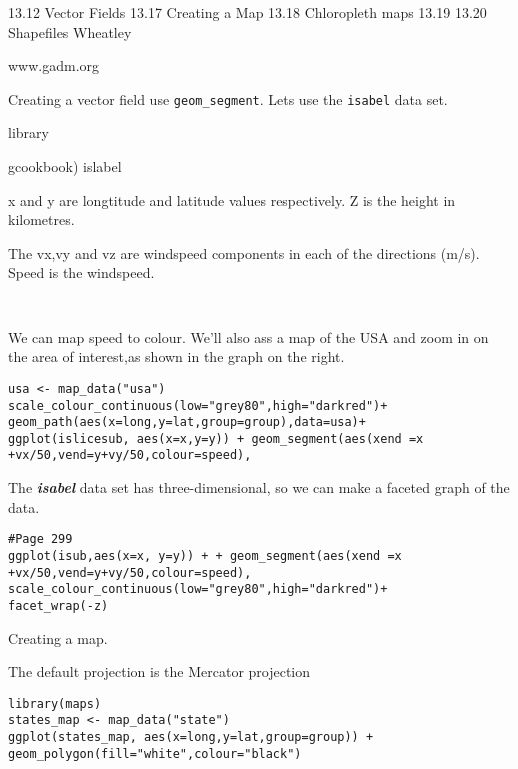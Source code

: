 13.12 Vector Fields
13.17 Creating a Map
13.18 Chloropleth maps
13.19 
13.20 Shapefiles
Wheatley

www.gadm.org

Creating a vector field
use \texttt{geom_segment}. Lets use the \texttt{isabel} data set.


library{gcookbook)
islabel

x and y are longtitude and latitude values respectively.
Z is the height in kilometres.

The vx,vy and vz are windspeed components in each of the directions (m/s).
Speed is the windspeed.

\begin{framed}
\begin{verbatim}


\end{verbatim}
\end{framed}

We can map speed to colour. We'll also ass a map of 
the USA and zoom in on the area of interest,as shown in the graph on the right.

\begin{verbatim}
usa <- map_data("usa")
scale_colour_continuous(low="grey80",high="darkred")+
geom_path(aes(x=long,y=lat,group=group),data=usa)+
ggplot(islicesub, aes(x=x,y=y)) + geom_segment(aes(xend =x +vx/50,vend=y+vy/50,colour=speed),
\end{verbatim}
The \textbf{\textit{isabel}} data set has three-dimensional, so we can make a faceted graph of the data.

\begin{verbatim}
#Page 299
ggplot(isub,aes(x=x, y=y)) + + geom_segment(aes(xend =x +vx/50,vend=y+vy/50,colour=speed),
scale_colour_continuous(low="grey80",high="darkred")+
facet_wrap(-z)
\end{verbatim}
Creating a map.

The default projection is the Mercator projection

\begin{verbatim}
library(maps)
states_map <- map_data("state")
ggplot(states_map, aes(x=long,y=lat,group=group)) + geom_polygon(fill="white",colour="black")


\end{verbatim}}
